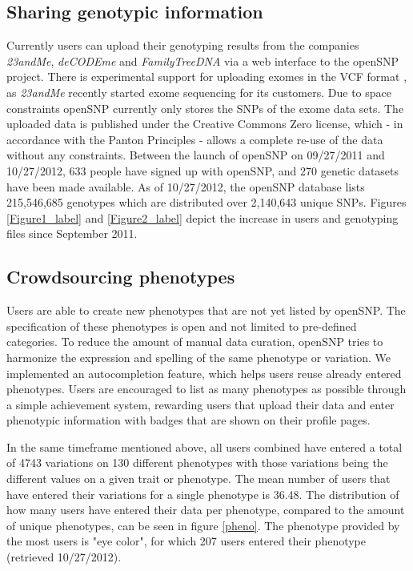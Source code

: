 \documentclass[10pt]{article}
\begin{document}
\subsection*{Sharing genotypic information}
Currently users can upload their genotyping results from the companies \textit{23andMe}, \textit{deCODEme} and \textit{FamilyTreeDNA} via a web interface to the openSNP 
project. There is experimental support for uploading exomes in the VCF format \cite{Danecek01082011}, as \textit{23andMe} recently started exome sequencing for its customers. Due to space constraints openSNP currently only stores the SNPs of the exome data sets.
The uploaded data is published under the Creative Commons Zero license, 
which - in accordance with the Panton Principles \cite{10.1371/journal.pbio.1001195} - 
allows a complete re-use of the data without any constraints.
Between the launch of openSNP on 09/27/2011 and 10/27/2012, 633 people have signed 
up with openSNP, and 270 genetic datasets have been made available. As of 10/27/2012, the openSNP database lists 215,546,685 genotypes which are distributed over 2,140,643 unique SNPs.
Figures \ref{Figure1_label} and \ref{Figure2_label} depict the increase in users and genotyping files since September 2011.


\subsection*{Crowdsourcing phenotypes}
Users are able to create new phenotypes that are not yet 
listed by openSNP. 
The specification of these phenotypes is open and not limited 
to pre-defined categories. To reduce the amount of manual data curation, openSNP tries to harmonize 
the expression and spelling of the same phenotype or variation. We implemented an 
autocompletion feature, which helps users reuse already entered phenotypes.
Users are encouraged to list as many phenotypes as possible through a simple 
achievement system, rewarding users that upload their data and enter phenotypic 
information with badges that are shown on their profile pages.

In the same timeframe mentioned above, all users combined have 
entered a total of 4743 variations on 130 different phenotypes with those variations being 
the different values on a given trait or phenotype. The mean number of users that have entered their variations for a single phenotype 
is 36.48. The distribution of how many users have 
entered their data per phenotype, compared to the amount of unique phenotypes, can be seen in figure \ref{pheno}. The phenotype provided by the most users is "eye color", for which 207 users entered their phenotype (retrieved 10/27/2012). 
\end{document}
